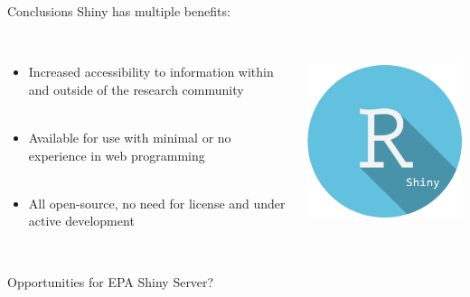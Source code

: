 \documentclass[serif]{beamer}\usepackage[]{graphicx}\usepackage[]{color}
\begin{document}
\begin{frame}{Conclusions}
Shiny has multiple benefits:\\~\\
\begin{columns}
\begin{column}{0.8\textwidth}
\begin{itemize}
\item Increased accessibility to information within and outside of the research community \\~\\
\item Available for use with minimal or no experience in web programming \\~\\
\item All open-source, no need for license and under active development \\~\\
\end{itemize}
\end{column}
\begin{column}{0.2\textwidth}
\centerline{\includegraphics[width = \textwidth]{fig/shiny_logo.png}}
\end{column}
\end{columns}
\vspace{0.16in}
Opportunities for EPA Shiny Server?
\end{frame}
\end{document}
